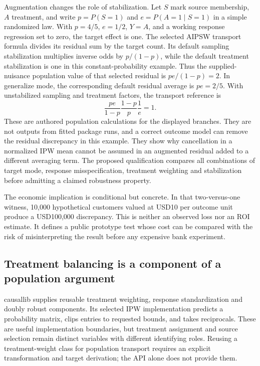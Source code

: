 Augmentation changes the role of stabilization. Let $S$ mark source membership, $A$ treatment, and write $p=P(S=1)$ and $e=P(A=1\mid S=1)$ in a simple randomized law. With $p=4/5$, $e=1/2$, $Y=A$, and a working response regression set to zero, the target effect is one. The selected AIPSW transport formula divides its residual sum by the target count. Its default sampling stabilization multiplies inverse odds by $p/(1-p)$, while the default treatment stabilization is one in this constant-probability example. Thus the supplied-nuisance population value of that selected residual is $pe/(1-p)=2$. In generalize mode, the corresponding default residual average is $pe=2/5$. With unstabilized sampling and treatment factors, the transport reference is
\[
 \frac{pe}{1-p}\frac{1-p}{p}\frac1e=1.
\]
These are authored population calculations for the displayed branches. They are not outputs from fitted package runs, and a correct outcome model can remove the residual discrepancy in this example. They show why cancellation in a normalized IPW mean cannot be assumed in an augmented residual added to a different averaging term. The proposed qualification compares all combinations of target mode, response misspecification, treatment weighting and stabilization before admitting a claimed robustness property.\citep{exec25_ptm_zepid,exec25_ptm_choice}

The economic implication is conditional but concrete. In that two-versus-one witness, 10,000 hypothetical customers valued at USD10 per outcome unit produce a USD100,000 discrepancy. This is neither an observed loss nor an ROI estimate. It defines a public prototype test whose cost can be compared with the risk of misinterpreting the result before any expensive bank experiment.\citep{exec25_ptm_choice}

\subsection{Treatment balancing is a component of a population argument}

causallib supplies reusable treatment weighting, response standardization and doubly robust components. Its selected IPW implementation predicts a probability matrix, clips entries to requested bounds, and takes reciprocals. These are useful implementation boundaries, but treatment assignment and source selection remain distinct variables with different identifying roles. Reusing a treatment-weight class for population transport requires an explicit transformation and target derivation; the API alone does not provide them.\citep{exec25_ptm_causallib}

